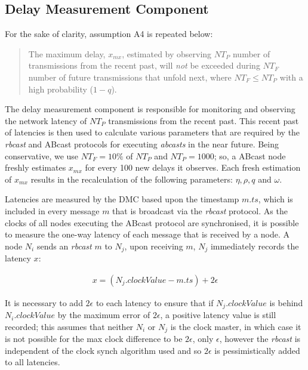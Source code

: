     
	\subsection{Delay Measurement Component}\label{ssec:dmc}
        For the sake of clarity, assumption A4 is repeated below:	
        
        \begin{quotation}
            The maximum delay, $x_{mx}$, estimated by observing $NT_P$ number of transmissions from the recent past, will \emph{not} be exceeded during $NT_F$ number of future transmissions that unfold next, where $NT_F \leq NT_P$ with a high probability ($1 - q$).
        \end{quotation}
	
        The delay measurement component is responsible for monitoring and observing the network latency of $NT_P$ transmissions from the recent past.  This recent past of latencies is then used to calculate various parameters that are required by the \emph{rbcast} and \textsf{ABcast} protocols for executing \emph{abcasts} in the near future.  Being conservative, we use $NT_F = 10\%$ of $NT_P$ and $NT_P=1000$; so, a \textsf{ABcast} node freshly estimates $x_{mx}$ for every 100 new delays it observes.  Each fresh estimation of $x_{mx}$ results in the recalculation of the following parameters: $\eta, \rho, q$ and $\omega$.  
        
        Latencies are measured by the DMC based upon the timestamp $m.ts$, which is included in every message $m$ that is broadcast via the \emph{rbcast} protocol.  As the clocks of all nodes executing the \textsf{ABcast} protocol are synchronised, it is possible to measure the one-way latency of each message that is received by a node.  A node $N_i$ sends an \emph{rbcast} $m$ to $N_j$, upon receiving $m$, $N_j$ immediately records the latency $x$:

        \begin{equation*}
		     \begin{aligned}
		         x = (N_j.clockValue - m.ts) + 2\epsilon
		     \end{aligned}
        \end{equation*}        
        
        It is necessary to add $2\epsilon$ to each latency to ensure that if $N_j.clockValue$ is behind $N_i.clockValue$ by the maximum error of $2\epsilon$, a positive latency value is still recorded; this assumes that neither $N_i$ or $N_j$ is the clock master, in which case it is not possible for the max clock difference to be $2\epsilon$, only $\epsilon$, however the \emph{rbcast} is independent of the clock synch algorithm used and so $2\epsilon$ is pessimistically added to all latencies.  
                
